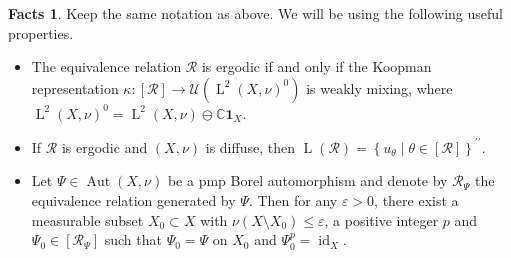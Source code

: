 \documentclass[11pt]{amsart}
\numberwithin{equation}{section}
\theoremstyle{plain}
\theoremstyle{definition}
\newtheorem{facts}[thm]{Facts}
\newcommand{\C}{\mathbb{C}}
\newcommand{\Aut}{\operatorname{Aut}}
\newcommand{\id}{\operatorname{id}}
\newcommand{\dpr}{^{\prime\prime}}
\newcommand{\rL}{\operatorname{L}}
\begin{document}
\begin{facts}\label{fact-ergodic}
Keep the same notation as above. We will be using the following useful properties.
\begin{itemize}
    \item [$(\rm i)$] The equivalence relation $\mathscr R$ is ergodic if and only if the Koopman representation $\kappa : [\mathscr R] \to \mathscr U(\rL^2(X,\nu)^0)$ is weakly mixing, where $\rL^2(X, \nu)^0 = \rL^2(X, \nu) \ominus \C \mathbf 1_X$. 

    \item [$(\rm ii)$] If $\mathscr R$ is ergodic and $(X, \nu)$ is diffuse, then $\rL(\mathscr R) = \left\{u_\theta \mid \theta \in [\mathscr R] \right\}\dpr$. 
    
    \item [$(\rm iii)$] Let $\Psi \in \Aut(X, \nu)$ be a pmp Borel automorphism and denote by $\mathscr R_\Psi$ the equivalence relation generated by $\Psi$. Then for any $\varepsilon>0$, there exist a measurable subset $X_0\subset X$ with $\nu(X\setminus X_0)\leq \varepsilon$, a positive integer $p$ and $\Psi_0\in [\mathscr R_\Psi]$ such that $\Psi_0=\Psi$ on $X_0$ and $\Psi_0^p= \id_X$.
\end{itemize}
\end{facts}
\end{document}
